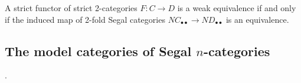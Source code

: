 \documentclass[a4paper]{amsart}
\begin{document}
\begin{lemma}[\cite{MR2366560}] \label{lma:2catnervereflectsequiv}
	A strict functor of strict 2-categories $F: C \to D$ is a weak equivalence if and only if the induced map of 2-fold Segal categories $NC_{\bullet \bullet} \to ND_{\bullet \bullet}$ is an equivalence. %
\end{lemma}


\subsection{The model categories of Segal $n$-categories}

.%
\end{document}

